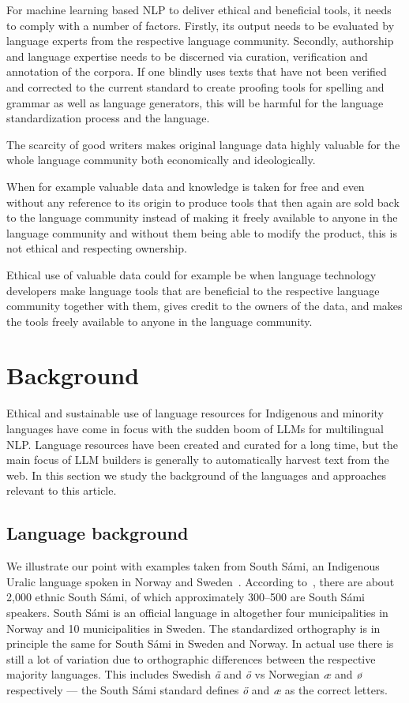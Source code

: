 \documentclass[free]{flammie}
\begin{document}
For machine learning based NLP to deliver ethical and beneficial tools, it needs
to comply with a number of factors.  Firstly, its output needs to be evaluated
by language experts from the respective language community.  Secondly,
authorship and language expertise needs to be discerned via curation,
verification and annotation of the corpora.  If one blindly uses texts that have
not been verified and corrected to the current standard to create proofing tools
for spelling and grammar as well as language generators, this will be harmful
for the language standardization process and the language.

The scarcity of good writers makes original language data highly valuable for
the whole language community both economically and ideologically.

When for example valuable data and knowledge is taken for free and even without
any reference to its origin to produce tools that then again are sold back to
the language community instead of making it freely available to anyone in the
language community and without them being able to modify the product, this is
not ethical and respecting ownership.

Ethical use of valuable data could for example be when language technology
developers make language tools that are beneficial to the respective language
community together with them, gives credit to the owners of the data, and makes
the tools freely available to anyone in the language community.

\section{Background}

Ethical and sustainable use of language resources for Indigenous and minority
languages have come in focus with the sudden boom of LLMs for multilingual
NLP\@.  Language resources have been created and curated for a long time, but
the main focus of LLM builders is generally to automatically harvest text from
the web.  In this section we study the background of the languages and
approaches relevant to this article.

\subsection{Language background}

We illustrate our point with examples taken from South Sámi, an Indigenous
Uralic language spoken in Norway and Sweden~\cite{ylikoski2022lule}.
According to~\cite[p.110]{Blokland2003endangered}, there are about 2,000 ethnic
South Sámi, of which approximately 300--500 are South Sámi speakers. South Sámi
is an official language in altogether four municipalities in Norway and 10
municipalities in Sweden.  The standardized orthography is in principle the same
for South Sámi in Sweden and Norway. In actual use there is still a lot of
variation due to orthographic differences between the respective majority
languages. This includes Swedish \textit{ä} and \textit{ö} vs Norwegian
\textit{æ} and \textit{ø} respectively --- the South Sámi standard defines
\textit{ö} and \textit{æ} as the correct letters.
\end{document}
